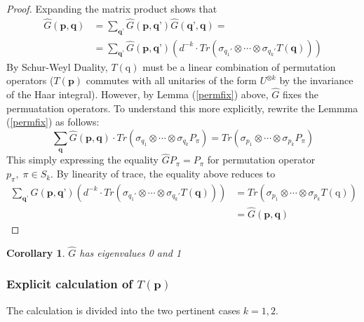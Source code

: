 \documentclass[12pt]{amsart}
\newtheorem{corollary}{Corollary}[theorem]
\theoremstyle{definition}
\theoremstyle{remark}
\numberwithin{equation}{section}
\theoremstyle{remark}
\begin{document}
\begin{proof}
  Expanding the matrix product shows that
  \begin{align}
     \widehat{G}(\textbf{p},\textbf{q})
     & = \sum_{\textbf{q'}} \widehat{G}(\textbf{p},\textbf{q'})\widehat{G}(\textbf{q'},\textbf{q}) = \\
     & = \sum_{\textbf{q'}} \widehat{G}(\textbf{p},\textbf{q'})
          \left( d^{-k} \cdot Tr(\sigma_{q_1'} \otimes \cdots \otimes \sigma_{q_k'}T(\textbf{q})) \right)
  \end{align}
  By Schur-Weyl Duality, $T(\text{q})$ must be a linear combination of permutation operators ($T(\textbf{p})$ commutes with all unitaries of the form $U^{\otimes k}$ by the invariance of the Haar integral). However, by Lemma (\ref{permfix}) above, $\widehat{G}$ fixes the permuatation operators. To understand this more explicitly, rewrite the Lemmma (\ref{permfix}) as follows:
  \begin{equation}
    \sum_{\textbf{q}} \widehat{G}(\textbf{p},\textbf{q})\cdot Tr(\sigma_{q_1} \otimes \cdots \otimes \sigma_{q_k} P_\pi) = Tr(\sigma_{p_1} \otimes \cdots \otimes \sigma_{p_k}P_\pi)
  \end{equation}
  This simply expressing the equality $\widehat{G}P_\pi = P_\pi$ for permutation operator $p_\pi, \; \pi \in S_{k}$. By linearity of trace, the equality above reduces to
  \begin{align}
    \sum_{\textbf{q'}} \widehat{G}(\textbf{p},\textbf{q'})
         \left( d^{-k} \cdot Tr(\sigma_{q_1'} \otimes \cdots \otimes \sigma_{q_k'}T(\textbf{q})) \right)
         & = Tr(\sigma_{p_1} \otimes \cdots \otimes \sigma_{p_k} T(\text{q})) \\
         & = \widehat{G}(\textbf{p},\textbf{q})
  \end{align}
\end{proof}

\begin{corollary}
$\widehat{G}$ has eigenvalues 0 and 1
\end{corollary}

\subsubsection{Explicit calculation of $T(\textbf{p})$} \label{eigenanalysis}
The calculation is divided into the two pertinent cases $k=1,2$. \newline
\end{document}

